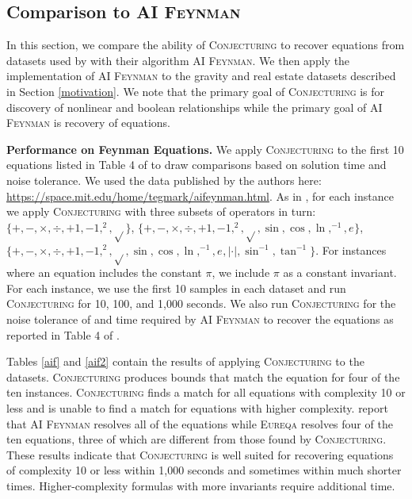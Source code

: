 \documentclass[ijds,nonblindrev]{informs-ijds}
\begin{document}
\subsection{Comparison to \textsc{AI Feynman} \citep{UdrescuTegmark20}}
\label{comparison}
In this section, we compare the ability of \textsc{Conjecturing} to recover equations from datasets used by \cite{UdrescuTegmark20} with their algorithm \textsc{AI Feynman}. 
We then apply the implementation of \textsc{AI Feynman} to the gravity and real estate datasets described in Section \ref{motivation}.  We note that the primary goal of \textsc{Conjecturing} is for discovery of nonlinear and boolean relationships while the primary goal of \textsc{AI Feynman} is recovery of equations.  


{\bf Performance on Feynman Equations.} %
We apply \textsc{Conjecturing} to the first 10 equations listed in Table 4 of \citep{UdrescuTegmark20} to draw comparisons based on solution time and noise tolerance.  We used the data published by the authors here: \url{https://space.mit.edu/home/tegmark/aifeynman.html}.
As in \citep{UdrescuTegmark20}, for each instance we apply \textsc{Conjecturing} with three subsets of operators in turn: $\{+, -, \times, \div, +1, -1, ^2, \sqrt{}\}$, 
$\{+, -, \times, \div, +1, -1, ^2, \sqrt{}, \sin, \cos, \ln, ^{-1}, e^{}\}$, 
$\{+, -, \times, \div, +1, -1, ^2, \sqrt{}, \sin, \cos, \ln, ^{-1}, e^{}, |\cdot|, \sin^{-1}, \tan^{-1}\}$. 
For instances where an equation includes the constant $\pi$, we include $\pi$ as a constant invariant.  For each instance, we use the first 10 samples in each dataset and run \textsc{Conjecturing} for 10, 100, and 1,000 seconds.  We also run \textsc{Conjecturing} for the noise tolerance of and time required by \textsc{AI Feynman} to recover the equations as reported in Table 4 of \citep{UdrescuTegmark20}.  

Tables \ref{aif} and \ref{aif2} contain the results of applying \textsc{Conjecturing} to the datasets.   \textsc{Conjecturing} produces bounds that match the equation for four of the ten instances.  \textsc{Conjecturing} finds a match for all equations with complexity 10 or less and is unable to find a match for equations with higher complexity.  \citet{UdrescuTegmark20} report that \textsc{AI Feynman} resolves all of the equations while \textsc{Eureqa} \citep{SchmLips09} resolves four of the ten equations, three of which are different from those found by \textsc{Conjecturing}.  These results indicate that \textsc{Conjecturing} is well suited for recovering equations of complexity 10 or less within 1,000 seconds and sometimes within much shorter times.  Higher-complexity formulas with more invariants require additional time.
\end{document}
